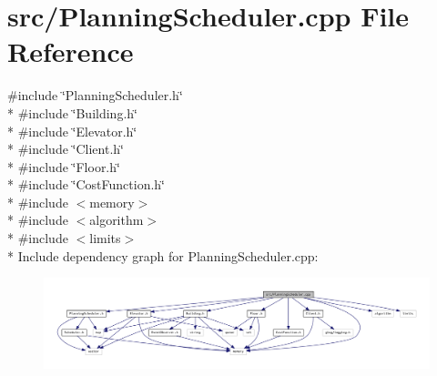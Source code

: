 \section{src/\+Planning\+Scheduler.cpp File Reference}
\label{_planning_scheduler_8cpp}
{\ttfamily \#include \char`\"{}Planning\+Scheduler.\+h\char`\"{}}\\*
{\ttfamily \#include \char`\"{}Building.\+h\char`\"{}}\\*
{\ttfamily \#include \char`\"{}Elevator.\+h\char`\"{}}\\*
{\ttfamily \#include \char`\"{}Client.\+h\char`\"{}}\\*
{\ttfamily \#include \char`\"{}Floor.\+h\char`\"{}}\\*
{\ttfamily \#include \char`\"{}Cost\+Function.\+h\char`\"{}}\\*
{\ttfamily \#include $<$memory$>$}\\*
{\ttfamily \#include $<$algorithm$>$}\\*
{\ttfamily \#include $<$limits$>$}\\*
Include dependency graph for Planning\+Scheduler.\+cpp\+:
\nopagebreak
\begin{figure}[H]
\begin{center}
\leavevmode
\includegraphics[width=350pt]{_planning_scheduler_8cpp__incl}
\end{center}
\end{figure}

